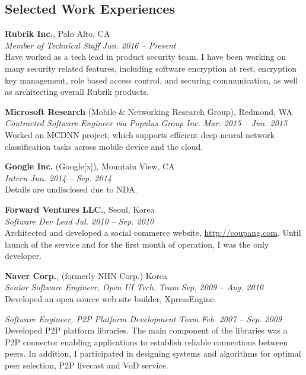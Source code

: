 \documentclass[line]{res}
\newenvironment{list1}{
  \begin{list}{\ding{113}}{%
      \setlength{\itemsep}{0in}
      \setlength{\parsep}{0in} \setlength{\parskip}{0in}
      \setlength{\topsep}{0in} \setlength{\partopsep}{0in}
      \setlength{\leftmargin}{0.17in}}}{\end{list}}
\begin{document}
\begin{resume}

\section{Selected Work Experiences}
{\bf Rubrik Inc.}, Palo Alto, CA \\
{\em Member of Technical Staff} \hfill {\it Jun. 2016 -- Present} \\
Have worked as a tech lead in product security team. I have been working on many security related features, including
software encryption at rest, encryption key management, role based access control, and securing communication, as well
as architecting overall Rubrik products.

{\bf Microsoft Research} (Mobile \& Networking Research Group), Redmond, WA \\
{\em Contracted Software Engineer via Populus Group Inc.} \hfill{\it Mar. 2015 -- Jun. 2015} \\
Worked on MCDNN project, which supports efficient deep neural network classification tasks across mobile device and the cloud.

{\bf Google Inc.} (Google[x]), Mountain View, CA \\
{\em Intern} \hfill {\it Jun. 2014 -- Sep. 2014} \\
Details are undisclosed due to NDA.

{\bf Forward Ventures LLC.}, Seoul, Korea \\
{\em Software Dev Lead} \hfill {\it Jul. 2010 -- Sep. 2010} \\
Architected and developed a social commerce website, \url{http://coupang.com}. Until launch of the service and for the first month of operation, I was the only developer.

{\bf Naver Corp.}, (formerly NHN Corp.) Korea \\
{\em Senior Software Engineer, Open UI Tech. Team} \hfill {\it Sep. 2009 -- Aug. 2010}\\
Developed an open source web site builder, XpressEngine.

{\em Software Engineer, P2P Platform Development Team} \hfill {\it Feb. 2007 -- Sep. 2009}\\
Developed P2P platform libraries. %
The main component of the libraries was a P2P connector enabling applications to establish reliable connections between peers. 
In addition, I participated in designing systems and algorithms for optimal peer
selection, P2P livecast and VoD service. \\\\




\end{resume}
\end{document}

